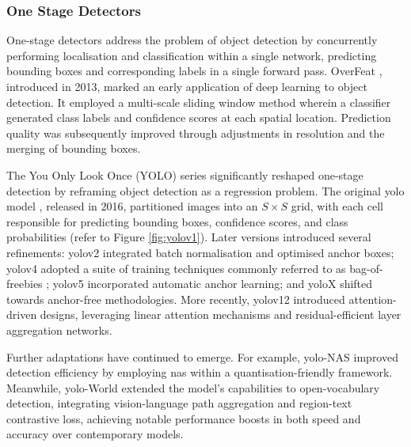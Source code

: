 
\subsubsection{One Stage Detectors}
\label{subsubsec:2_onestage}

One-stage detectors address the problem of object detection by concurrently performing localisation and classification within a single network, predicting bounding boxes and corresponding labels in a single forward pass.
OverFeat \cite{overfeat}, introduced in 2013, marked an early application of deep learning to object detection. It employed a multi-scale sliding window method wherein a classifier generated class labels and confidence scores at each spatial location. Prediction quality was subsequently improved through adjustments in resolution and the merging of bounding boxes.

The You Only Look Once (YOLO) series significantly reshaped one-stage detection by reframing object detection as a regression problem. The original \gls{yolo} model \cite{yolo}, released in 2016, partitioned images into an $S \times S$ grid, with each cell responsible for predicting bounding boxes, confidence scores, and class probabilities (refer to Figure \ref{fig:yolov1}). Later versions introduced several refinements: \gls{yolo}v2 \cite{yolov2} integrated batch normalisation and optimised anchor boxes; \gls{yolo}v4 \cite{yolov4} adopted a suite of training techniques commonly referred to as bag-of-freebies \cite{bagoffreebies}; \gls{yolo}v5 \cite{yolov5} incorporated automatic anchor learning; and \gls{yolo}X \cite{yolox} shifted towards anchor-free methodologies. More recently, \gls{yolo}v12 \cite{yolov12} introduced attention-driven designs, leveraging linear attention mechanisms and residual-efficient layer aggregation networks.

Further adaptations have continued to emerge. For example, \gls{yolo}-NAS \cite{yolonas} improved detection efficiency by employing \gls{nas} within a quantisation-friendly framework. Meanwhile, \gls{yolo}-World \cite{yoloworld} extended the model’s capabilities to open-vocabulary detection, integrating vision-language path aggregation and region-text contrastive loss, achieving notable performance boosts in both speed and accuracy over contemporary models.

